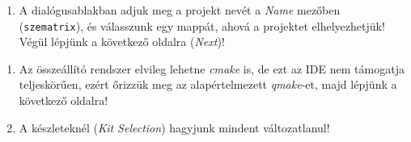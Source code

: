 \begin{frame}
  \begin{enumerate}
    \setcounter{enumi}{\theqt}
    \item A dialógusablakban adjuk meg a projekt nevét a \emph{Name} mezőben (\texttt{szematrix}), és válasszunk egy mappát, ahová a projektet elhelyezhetjük! Végül lépjünk a következő oldalra (\emph{Next})!\\
    \setcounter{qt}{\theenumi}
  \end{enumerate}
\end{frame}

\begin{frame}
  \begin{enumerate}
    \setcounter{enumi}{\theqt}
    \item Az összeállító rendszer elvileg lehetne \emph{cmake} is, de ezt az IDE nem támogatja teljeskörűen, ezért őrizzük meg 
az alapértelmezett \emph{qmake}-et, majd lépjünk a következő oldalra!\\
    \item A készleteknél (\emph{Kit Selection}) hagyjunk mindent változatlanul!
    \setcounter{qt}{\theenumi}
  \end{enumerate}
\end{frame}

